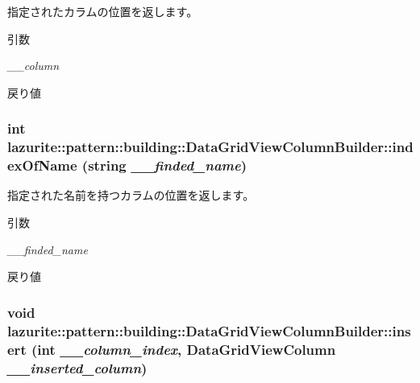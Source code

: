 指定されたカラムの位置を返します。 
\begin{DoxyParams}{引数}
\item[{\em \_\-\_\-column}]\end{DoxyParams}
\begin{DoxyReturn}{戻り値}

\end{DoxyReturn}
\hypertarget{classlazurite_1_1pattern_1_1building_1_1_data_grid_view_column_builder_a0a78b6ea5e956bc1f4e09e5239783ffe}{
\subsubsection[{indexOfName}]{\setlength{\rightskip}{0pt plus 5cm}int lazurite::pattern::building::DataGridViewColumnBuilder::indexOfName (string {\em \_\-\_\-finded\_\-name})}}
\label{classlazurite_1_1pattern_1_1building_1_1_data_grid_view_column_builder_a0a78b6ea5e956bc1f4e09e5239783ffe}


指定された名前を持つカラムの位置を返します。 
\begin{DoxyParams}{引数}
\item[{\em \_\-\_\-finded\_\-name}]\end{DoxyParams}
\begin{DoxyReturn}{戻り値}

\end{DoxyReturn}
\hypertarget{classlazurite_1_1pattern_1_1building_1_1_data_grid_view_column_builder_a6ad21586ca876a81078b44742dd8de39}{
\subsubsection[{insert}]{\setlength{\rightskip}{0pt plus 5cm}void lazurite::pattern::building::DataGridViewColumnBuilder::insert (int {\em \_\-\_\-column\_\-index}, \/  DataGridViewColumn {\em \_\-\_\-inserted\_\-column})}}
\label{classlazurite_1_1pattern_1_1building_1_1_data_grid_view_column_builder_a6ad21586ca876a81078b44742dd8de39}


